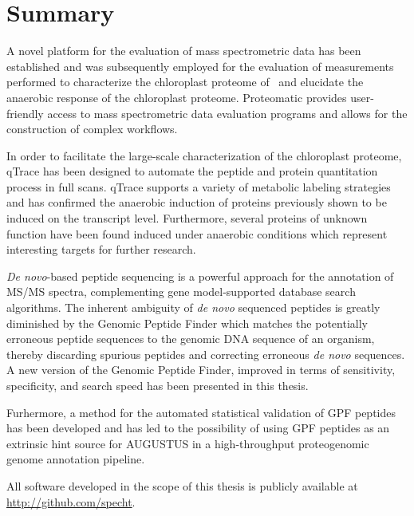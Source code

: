 \cleardoublepage
\chapter{Summary}

A novel platform for the evaluation of mass spectrometric data has been
established and was subsequently employed for the evaluation of measurements
performed to characterize the chloroplast proteome of \cre~and elucidate
the anaerobic response of the chloroplast proteome.
Proteomatic provides user-friendly access to mass spectrometric data 
evaluation programs and allows for the construction of complex workflows.

In order to facilitate the large-scale characterization of the chloroplast
proteome, qTrace has been designed to automate the peptide and protein 
quantitation process in full scans.
qTrace supports a variety of metabolic labeling strategies and has 
confirmed the anaerobic induction of proteins previously shown to be induced on
the transcript level.
Furthermore, several proteins of unknown function have been found induced
under anaerobic conditions which represent interesting targets for further 
research.

{\em De novo}-based peptide sequencing is a powerful approach for the annotation
of MS/MS spectra, complementing gene model-supported database search algorithms.
The inherent ambiguity of {\em de novo} sequenced peptides is greatly diminished
by the Genomic Peptide Finder which matches the potentially erroneous
peptide sequences to the genomic DNA sequence of an organism, thereby discarding
spurious peptides and correcting erroneous {\em de novo} sequences.
A new version of the Genomic Peptide Finder, improved in terms of sensitivity, 
specificity, and search speed has been presented in this thesis.

Furhermore, a method for the automated statistical validation of GPF peptides
has been developed and has led to the possibility of using GPF peptides as
an extrinsic hint source for AUGUSTUS in a high-throughput proteogenomic genome 
annotation pipeline.

All software developed in the scope of this thesis is publicly available
at \href{http://github.com/specht}{http://github.com/specht}.
